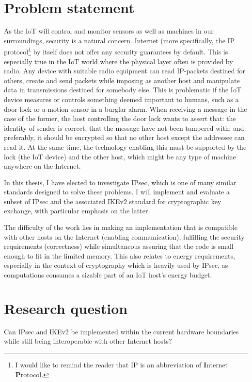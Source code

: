 \documentclass[final,a4paper,twoside,11pt,onecolumn]{report}
\begin{document}
\section{Problem statement}
As the IoT will control and monitor sensors as well as machines in our surroundings, security is a natural concern. Internet (more specifically, the IP protocol\footnote{I would like to remind the reader that IP is an abbreviation of \textbf{I}nternet \textbf{P}rotocol.} by itself does not offer any security guarantees by default. This is especially true in the IoT world where the physical layer often is provided by radio. Any device with suitable radio equipment can read IP-packets destined for others, create and send packets while imposing as another host and manipulate data in transmissions destined for somebody else. This is problematic if the IoT device measures or controls something deemed important to humans, such as a door lock or a motion sensor in a burglar alarm. When receiving a message in the case of the former, the host controlling the door lock wants to assert that: the identity of sender is correct; that the message have not been tampered with; and preferably, it should be encrypted so that no other host except the addressee can read it. At the same time, the technology enabling this must be supported by the lock (the IoT device) and the other host, which might be any type of machine anywhere on the Internet.

In this thesis, I have elected to investigate IPsec, which is one of many similar standards designed to solve these problems. I will implement and evaluate a subset of IPsec and the associated IKEv2 standard for cryptographic key exchange, with particular emphasis on the latter.

The difficulty of the work lies in making an implementation that is compatible with other hosts on the Internet (enabling communication), fulfilling the security requirements (correctness) while simultaneous assuring that the code is small enough to fit in the limited memory. This also relates to energy requirements, especially in the context of cryptography which is heavily used by IPsec, as computations consumes a sizable part of an IoT host's energy budget.

\section{Research question}
Can IPsec and IKEv2 be implemented within the current hardware boundaries while still being interoperable with other Internet hosts?
 
\end{document}
